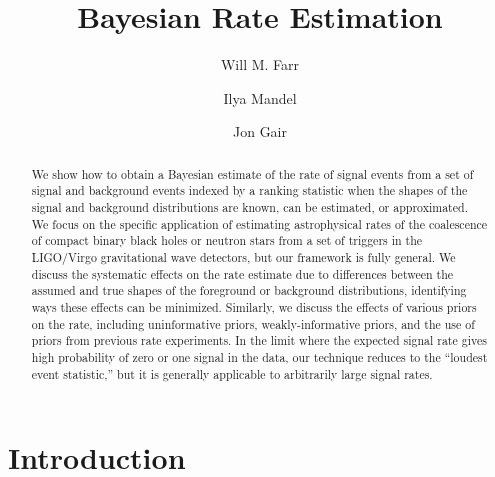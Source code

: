 \documentclass[aps,prd,reprint]{revtex4-1}
\begin{document}
\title{Bayesian Rate Estimation}

\author{Will M. Farr}

\author{Ilya Mandel}

\author{Jon Gair}

\begin{abstract}
  We show how to obtain a Bayesian estimate of the rate of signal
  events from a set of signal and background events indexed by a
  ranking statistic when the shapes of the signal and background
  distributions are known, can be estimated, or approximated.  We
  focus on the specific application of estimating astrophysical rates
  of the coalescence of compact binary black holes or neutron stars
  from a set of triggers in the LIGO/Virgo gravitational wave
  detectors, but our framework is fully general.  We discuss the
  systematic effects on the rate estimate due to differences between
  the assumed and true shapes of the foreground or background
  distributions, identifying ways these effects can be minimized.
  Similarly, we discuss the effects of various priors on the rate,
  including uninformative priors, weakly-informative priors, and the
  use of priors from previous rate experiments.  In the limit where
  the expected signal rate gives high probability of zero or one
  signal in the data, our technique reduces to the ``loudest event
  statistic,'' but it is generally applicable to arbitrarily large
  signal rates.
\end{abstract}

\maketitle

\section{Introduction}
\end{document}
